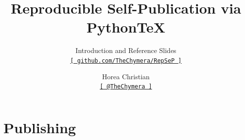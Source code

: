 
\title[Reproducible Self-Publication via Python\TeX\ --- Introduction and Reference Slides]{Reproducible Self-Publication via Python\TeX}
\subtitle{Introduction and Reference Slides\\\href{https://github.com/TheChymera/RepSeP}{\small\texttt{[ github.com/TheChymera/RepSeP ]}}}
\author[Horea Christian]{Horea Christian\\\href{https://twitter.com/TheChymera}{\small\texttt{[ @TheChymera ]}}}

	\begin{frame}
		\titlepage
	\end{frame}
	\section{Publishing}

